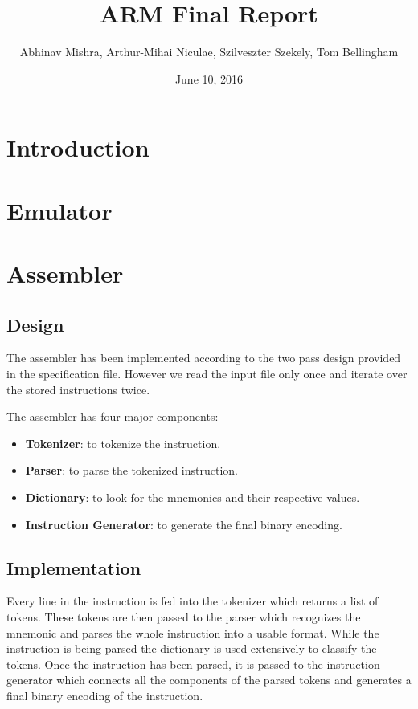 \documentclass[11pt]{article}
\begin{document}
\title{ARM Final Report}
\author{Abhinav Mishra, Arthur-Mihai Niculae,
	 Szilveszter Szekely, Tom Bellingham}
\date{June 10, 2016}

\maketitle

\section{Introduction}

\section{Emulator}

\section{Assembler}
\subsection{Design}
The assembler has been implemented according to the two pass design provided in
the specification file. However we read the input file only once and iterate
over the stored instructions twice.

The assembler has four major components:
\begin{itemize}[noitemsep,topsep=0pt]
	\item \textbf{Tokenizer}:
		to tokenize the instruction.
	\item \textbf{Parser}:
		to parse the tokenized instruction.
	\item \textbf{Dictionary}:
		to look for the mnemonics and their respective values.
	\item \textbf{Instruction Generator}:
		to generate the final binary encoding.
\end{itemize}

\subsection{Implementation}
Every line in the instruction is fed into the tokenizer which returns a list
of tokens. These tokens are then passed to the parser which recognizes the
mnemonic and parses the whole instruction into a usable format. While the
instruction is being parsed the dictionary is used extensively to classify the
tokens. Once the instruction has been parsed, it is passed to the instruction
generator which connects all the components of the parsed tokens and generates
a final binary encoding of the instruction.
\end{document}
